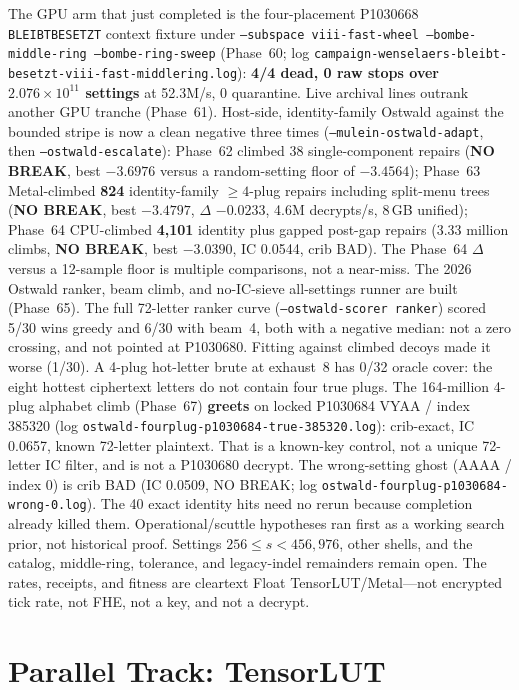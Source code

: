 \documentclass[11pt,a4paper]{article}
\begin{document}
The GPU arm that just completed is the four-placement P1030668
\texttt{BLEIBTBESETZT} context fixture under
\texttt{--subspace viii-fast-wheel --bombe-middle-ring --bombe-ring-sweep}
(Phase~60; log \texttt{campaign-wenselaers-bleibt-besetzt-viii-fast-middlering.log}):
\textbf{4/4 dead, 0 raw stops over $2.076\times10^{11}$ settings} at 52.3M/s,
0 quarantine. Live archival lines outrank another GPU tranche (Phase~61).
Host-side, identity-family Ostwald against the bounded stripe is now a clean
negative three times (\texttt{--mulein-ostwald-adapt}, then
\texttt{--ostwald-escalate}): Phase~62 climbed 38 single-component repairs
(\textbf{NO BREAK}, best $-3.6976$ versus a random-setting floor of $-3.4564$);
Phase~63 Metal-climbed \textbf{824} identity-family $\ge4$-plug repairs including
split-menu trees (\textbf{NO BREAK}, best $-3.4797$, $\Delta$ $-0.0233$, 4.6M
decrypts/s, 8\,GB unified); Phase~64 CPU-climbed \textbf{4{,}101} identity plus
gapped post-gap repairs (3.33 million climbs, \textbf{NO BREAK}, best $-3.0390$,
IC 0.0544, crib BAD). The Phase~64 $\Delta$ versus a 12-sample floor is
multiple comparisons, not a near-miss. The 2026 Ostwald ranker, beam climb, and
no-IC-sieve all-settings runner are built (Phase~65). The full 72-letter
ranker curve (\texttt{--ostwald-scorer ranker}) scored 5/30 wins greedy and
6/30 with beam~4, both with a negative median: not a zero crossing, and not
pointed at P1030680. Fitting against climbed decoys made it worse (1/30).
A 4-plug hot-letter brute at exhaust~8 has 0/32 oracle cover: the eight
hottest ciphertext letters do not contain four true plugs. The 164-million
4-plug alphabet climb (Phase~67) \textbf{greets} on locked P1030684
VYAA / index 385320 (log \texttt{ostwald-fourplug-p1030684-true-385320.log}):
crib-exact, IC 0.0657, known 72-letter plaintext. That is a known-key
control, not a unique 72-letter IC filter, and is not a P1030680 decrypt.
The wrong-setting ghost (AAAA / index 0) is crib BAD (IC 0.0509, NO BREAK;
log \texttt{ostwald-fourplug-p1030684-wrong-0.log}). The 40 exact identity hits need no rerun because completion already
killed them. Operational/scuttle hypotheses ran first as a working search
prior, not historical proof. Settings $256\le s<456{,}976$,
other shells, and the catalog, middle-ring, tolerance, and legacy-indel
remainders remain open. The rates, receipts, and fitness are cleartext Float
TensorLUT/Metal---not encrypted tick rate, not FHE, not a key, and not a decrypt.

\section{Parallel Track: TensorLUT}
\end{document}
